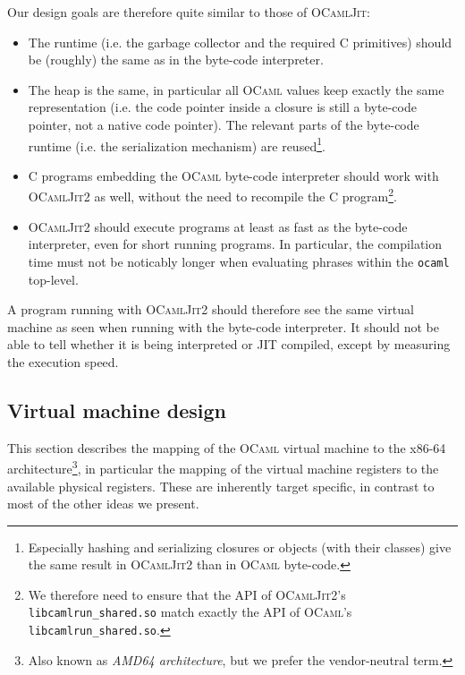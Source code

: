 \documentclass[10pt,a4paper,twocolumn]{article}
\begin{document}
Our design goals are therefore quite similar to those of \textsc{OCamlJit}:
\begin{itemize}
\item The runtime (i.e. the garbage collector and the required C primitives) should be 
  (roughly) the same as in the byte-code interpreter.
\item The heap is the same, in particular all \textsc{OCaml} values keep exactly the same representation
  (i.e. the code pointer inside a closure is still a byte-code pointer, not a native code pointer). The
  relevant parts of the byte-code runtime (i.e. the serialization mechanism) are reused\footnote{Especially
    hashing and serializing closures or objects (with their classes) give the same result
    in \textsc{OCamlJit2} than in \textsc{OCaml} byte-code.}.
\item C programs embedding the \textsc{OCaml} byte-code interpreter should work with \textsc{OCamlJit2}
  as well, without the need to recompile the C program\footnote{We therefore need to ensure that the
    API of \textsc{OCamlJit2}'s \texttt{libcamlrun\_shared.so} match exactly the API of \textsc{OCaml}'s
    \texttt{libcamlrun\_shared.so}.}.
\item \textsc{OCamlJit2} should execute programs at least as fast as the byte-code interpreter,
  even for short running programs. In particular, the compilation time must not be noticably
  longer when evaluating phrases within the \texttt{ocaml} top-level.
\end{itemize}
A program running with \textsc{OCamlJit2} should therefore see the same virtual machine as seen when
running with the byte-code interpreter. It should not be able to tell whether it is being interpreted
or JIT compiled, except by measuring the execution speed.

\subsection{Virtual machine design} \label{subsection:Virtual_machine_design}

This section describes the mapping of the \textsc{OCaml} virtual machine to the x86-64 architecture\footnote{
Also known as \emph{AMD64 architecture}, but we prefer the vendor-neutral term.},
in particular the mapping of the virtual machine registers to the available physical registers. These
are inherently target specific, in contrast to most of the other ideas we present.
\end{document}
